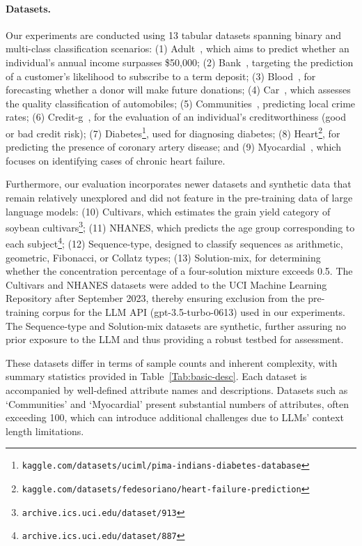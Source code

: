 \paragraph{Datasets.}
Our experiments are conducted using 13 tabular datasets spanning binary and multi-class classification scenarios: (1) Adult~\cite{asuncion2007uci}, which aims to predict whether an individual's annual income surpasses \$50,000; (2) Bank~\cite{moro2014data}, targeting the prediction of a customer's likelihood to subscribe to a term deposit; (3) Blood~\cite{yeh2009knowledge}, for forecasting whether a donor will make future donations; (4) Car~\cite{kadra2021well}, which assesses the quality classification of automobiles; (5) Communities~\cite{misc_communities_and_crime_183}, predicting local crime rates; (6) Credit-g~\cite{kadra2021well}, for the evaluation of an individual's creditworthiness (good or bad credit risk); (7) Diabetes\footnote{\texttt{kaggle.com/datasets/uciml/pima-indians-diabetes-database}}, used for diagnosing diabetes; (8) Heart\footnote{\texttt{kaggle.com/datasets/fedesoriano/heart-failure-prediction}}, for predicting the presence of coronary artery disease; and (9) Myocardial~\cite{misc_myocardial_infarction_complications_579}, which focuses on identifying cases of chronic heart failure.

Furthermore, our evaluation incorporates newer datasets and synthetic data that remain relatively unexplored and did not feature in the pre-training data of large language models: (10) Cultivars, which estimates the grain yield category of soybean cultivars\footnote{\texttt{archive.ics.uci.edu/dataset/913}}; (11) NHANES, which predicts the age group corresponding to each subject\footnote{\texttt{archive.ics.uci.edu/dataset/887}}; (12) Sequence-type, designed to classify sequences as arithmetic, geometric, Fibonacci, or Collatz types; (13) Solution-mix, for determining whether the concentration percentage of a four-solution mixture exceeds 0.5. The Cultivars and NHANES datasets were added to the UCI Machine Learning Repository after September 2023, thereby ensuring exclusion from the pre-training corpus for the LLM API (gpt-3.5-turbo-0613) used in our experiments. The Sequence-type and Solution-mix datasets are synthetic, further assuring no prior exposure to the LLM and thus providing a robust testbed for assessment.

These datasets differ in terms of sample counts and inherent complexity, with summary statistics provided in Table~\ref{Tab:basic-desc}. Each dataset is accompanied by well-defined attribute names and descriptions. Datasets such as `Communities' and `Myocardial' present substantial numbers of attributes, often exceeding 100, which can introduce additional challenges due to LLMs’ context length limitations.

